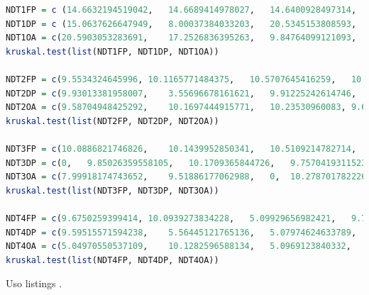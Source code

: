 \documentclass{article}
\begin{document}
\begin{lstlisting}[language=R, caption= C\'odigo utilizado para hacer pruebas de Kurskal-Wallis (Orden Tareas).]
NDT1FP = c (14.6632194519042,	14.6689414978027,	14.6400928497314,	14.7817134857177,	10.1368427276611,	16.0033702850341,	15.1014328002929,	14.5940780639648,	19.763708114624)
NDT1DP = c (15.0637626647949,	8.00037384033203,	20.5345153808593,	14.9371623992919,	15.2616500854492,	15.5577659606933,	13.9107704162597,	19.8197364807128,	19.3409919738769)
NDT1OA = c(20.5903053283691,	17.2526836395263,	9.84764099121093,	15.1457786560058,	15.122652053833,	15.3250694274902,	19.301414489746,	22.6647853851318,	13.5760307312011)
kruskal.test(list(NDT1FP, NDT1DP, NDT1OA))

NDT2FP = c(9.5534324645996,	10.1165771484375,	10.5707645416259,	10.1063251495361,	10.0808143615722,	9.58919525146484,	9.85145568847656,	11.9268894195556,	9.95707511901855)
NDT2DP = c(9.93013381958007,	3.55696678161621,	9.91225242614746,	10.1029872894287,	9.59086418151855,	10.1222991943359,	14.8596763610839,	15.1095390319824,	5.00893592834472)
NDT2OA = c(9.58704948425292,	10.1697444915771,	10.23530960083,	9.61017608642578,	9.20867919921875,	9.60993766784667,	9.87768173217773,	9.60707664489746,	9.50002670288085)
kruskal.test(list(NDT2FP, NDT2DP, NDT2OA))

NDT3FP = c(10.0886821746826,	10.1439952850341,	10.5109214782714,	4.04214859008789,	10.0753307342529,	9.83428955078125,	9.97304916381835,	10.3750228881835,	9.69386100769042)
NDT3DP = c(0,	9.85026359558105,	10.1709365844726,	9.75704193115234,	9.92989540100097,	10.394811630249,	10.3027820587158,	8.60190391540527,	5.08999824523925)
NDT3OA = c(7.99918174743652,	9.51886177062988,	0,	10.2787017822265,	10.3039741516113,	8.00061225891113,	14.5168304443359,	9.90939140319824,	0)
kruskal.test(list(NDT3FP, NDT3DP, NDT3OA))

NDT4FP = c(9.6750259399414,	10.0939273834228,	5.09929656982421,	9.71102714538574,	9.9799633026123,	10.0970268249511,	0,	8.00085067749023,	9.92918014526367)
NDT4DP = c(9.59515571594238,	5.56445121765136,	5.07974624633789,	10.1842880249023,	9.59181785583496,	0,	5.00750541687011,	10.0986957550048,	10.1239681243896)
NDT4OA = c(5.04970550537109,	10.1282596588134,	5.0969123840332,	5.04279136657714,	10.2267265319824,	5.08332252502441,	5.0661563873291,	9.28521156311035,	0)
kruskal.test(list(NDT4FP, NDT4DP, NDT4OA))
\end{lstlisting}

Uso listings \cite{CalculatorColor, Listingscolor, ListingsWidth}.
\end{document}
